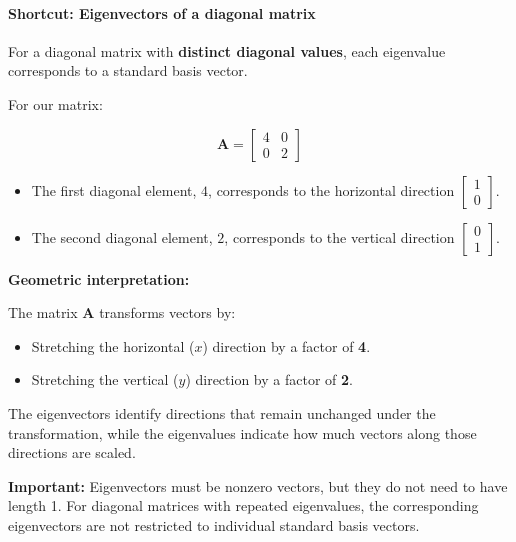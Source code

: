 \documentclass[11pt]{article}
\providecommand{\tightlist}{%
      \setlength{\itemsep}{0pt}\setlength{\parskip}{0pt}}
\begin{document}
\paragraph{Shortcut: Eigenvectors of a diagonal
matrix}\label{shortcut-eigenvectors-of-a-diagonal-matrix}

For a diagonal matrix with \textbf{distinct diagonal values}, each
eigenvalue corresponds to a standard basis vector.

For our matrix:

\[
\mathbf{A} =
\begin{bmatrix}
4 & 0 \\
0 & 2
\end{bmatrix}
\]

\begin{itemize}
\tightlist
\item
  The first diagonal element, \(4\), corresponds to the horizontal
  direction \(\begin{bmatrix}1\\0\end{bmatrix}\).
\item
  The second diagonal element, \(2\), corresponds to the vertical
  direction \(\begin{bmatrix}0\\1\end{bmatrix}\).
\end{itemize}

\textbf{Geometric interpretation:}

The matrix \(\mathbf{A}\) transforms vectors by:

\begin{itemize}
\tightlist
\item
  Stretching the horizontal (\(x\)) direction by a factor of \textbf{4}.
\item
  Stretching the vertical (\(y\)) direction by a factor of \textbf{2}.
\end{itemize}

The eigenvectors identify directions that remain unchanged under the
transformation, while the eigenvalues indicate how much vectors along
those directions are scaled.

\textbf{Important:} Eigenvectors must be nonzero vectors, but they do
not need to have length 1. For diagonal matrices with repeated
eigenvalues, the corresponding eigenvectors are not restricted to
individual standard basis vectors.
\end{document}

